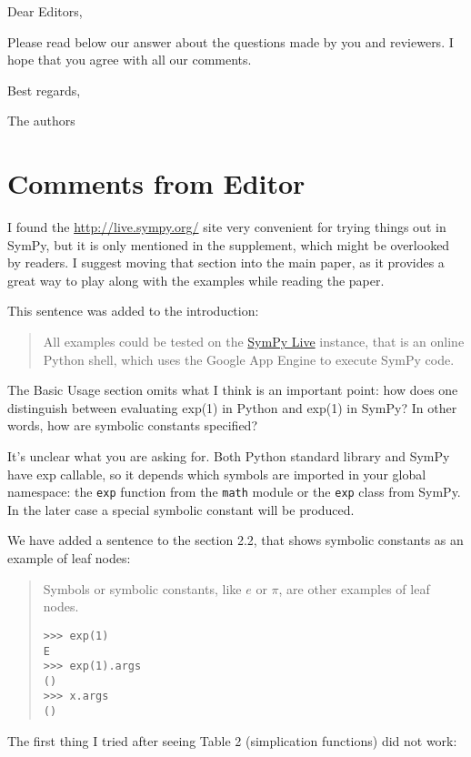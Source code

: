 \documentclass[answers,12pt]{exam}
\begin{document}
Dear Editors, \bigskip

Please read below our answer about the
questions made by you and reviewers. I hope that you agree
with all our comments. \bigskip

Best regards,\bigskip

The authors

\pagebreak

\section{Comments from Editor}

\begin{questions}
\question I found the \url{http://live.sympy.org/} site very convenient for trying things
out in SymPy, but it is only mentioned in the supplement, which might be
overlooked by readers. I suggest moving that section into the main paper, as
it provides a great way to play along with the examples while reading the
paper.
\begin{solution}
This sentence was added to the introduction:
\begin{quote}
All examples could be tested on the \href{http://live.sympy.org}{SymPy
Live} instance, that is an online Python shell, which uses the Google
App Engine to execute SymPy code.
\end{quote}
\end{solution}
\question The Basic Usage section omits what I think is an important point:
how does one distinguish between evaluating exp(1) in Python and exp(1) in
SymPy? In other words, how are symbolic constants specified?
\begin{solution}
  It's unclear what you are asking for. Both Python standard library and SymPy
  have exp callable, so it depends which symbols are imported in your global
  namespace: the \texttt{exp} function from the \texttt{math} module or the
  \texttt{exp} class from SymPy. In the later case a special symbolic constant
  will be produced.

We have added a sentence to the section 2.2, that shows symbolic
constants as an example of leaf nodes:
\begin{quote}
Symbols or symbolic constants, like $e$ or $\pi$, are other examples of
leaf nodes.
\begin{verbatim}
>>> exp(1)
E
>>> exp(1).args
()
>>> x.args
()
\end{verbatim}
\end{quote}
\end{solution}
\question The first
thing I tried after seeing Table 2 (simplication functions) did not work:


\end{questions}
\end{document}
